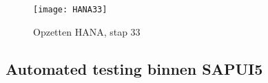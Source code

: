             \begin{figure}	
                \centering
                \texttt{[image: HANA33]}
                \caption{Opzetten HANA, stap 33} \label{HANA33}
            \end{figure} 
            
        \subsection{Automated testing binnen SAPUI5}
        \label{subsec:automated-testing-SAPUI5}
